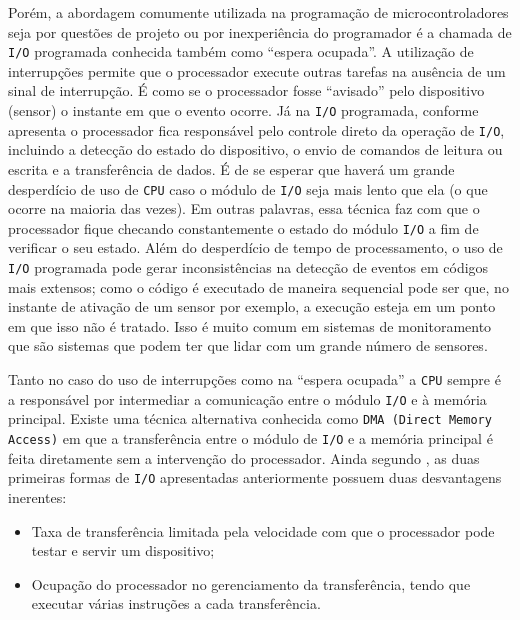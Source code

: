Porém, a abordagem comumente utilizada na programação de microcontroladores seja por questões de projeto ou por inexperiência do programador é a chamada de \texttt{I/O} programada conhecida também como “espera ocupada”. A utilização de interrupções permite que o processador execute outras tarefas na ausência de um sinal de interrupção. É como se o processador fosse “avisado” pelo dispositivo (sensor) o instante em que o evento ocorre. Já na \texttt{I/O} programada, conforme apresenta \cite{stail} o processador fica responsável pelo controle direto da operação de \texttt{I/O}, incluindo a detecção do estado do dispositivo, o envio de comandos de leitura ou escrita e a transferência de dados. É de se esperar que haverá um grande desperdício de uso de \texttt{CPU} caso o módulo de \texttt{I/O} seja mais lento que ela (o que ocorre na maioria das vezes). Em outras palavras, essa técnica faz com que o processador fique checando constantemente o estado do módulo \texttt{I/O} a fim de verificar o seu estado. Além do desperdício de tempo de processamento, o uso de \texttt{I/O} programada pode gerar inconsistências na detecção de eventos em códigos mais extensos; como o código é executado de maneira sequencial pode ser que, no instante de ativação de um sensor por exemplo, a execução esteja em um ponto em que isso não é tratado. Isso é muito comum em sistemas de monitoramento que são sistemas que podem ter que lidar com um grande número de sensores. 

Tanto no caso do uso de interrupções como na “espera ocupada” a \texttt{CPU} sempre é a responsável por intermediar a comunicação entre o módulo \texttt{I/O} e à memória principal. Existe uma técnica alternativa conhecida como \texttt{DMA (Direct Memory Access)} em que a transferência entre o módulo de \texttt{I/O} e a memória principal é feita diretamente sem a intervenção do processador.  Ainda segundo \cite{stail}, as duas primeiras formas de \texttt{I/O} apresentadas anteriormente possuem duas desvantagens inerentes: 

\begin{itemize}

	\item Taxa de transferência limitada pela velocidade com que o processador pode testar e servir um dispositivo;
	\item Ocupação do processador no gerenciamento da transferência, tendo que executar várias instruções a cada transferência. 

\end{itemize}

